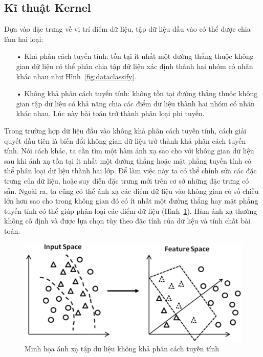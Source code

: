 \subsection*{Kĩ thuật Kernel}
Dựa vào đặc trưng về vị trí điểm dữ liệu, tập dữ liệu đầu vào có thể được chia làm hai loại:
\begin{itemize}
\item[•] Khả phân cách tuyến tính: tồn tại ít nhất một đường thẳng thuộc không gian dữ liệu có thể phân chia tập dữ liệu xác định thành hai nhóm có nhãn khác nhau như Hình~\ref{fig:dataclassify}.
\item[•] Không khả phân cách tuyến tính: không tồn tại đường thẳng thuộc không gian tập dữ liệu có khả năng chia các điểm dữ liệu thành hai nhóm có nhãn khác nhau. Lúc này bài toán trở thành phân loại phi tuyến.
\end{itemize}
Trong trường hợp dữ liệu đầu vào không khả phân cách tuyến tính, cách giải quyết đầu tiên là biến đổi không gian dữ liệu trở thành khả phân cách tuyến tính. Nói cách khác, ta cần tìm một hàm ánh xạ sao cho với không gian dữ liệu sau khi ánh xạ tồn tại ít nhất một đường thẳng hoặc mặt phẳng tuyến tính có thể phân loại dữ liệu thành hai lớp. Để làm việc này ta có thể chỉnh sửa các đặc trưng của dữ liệu, hoặc suy diễn đặc trưng mới trên cơ sở những đặc trưng có sẵn. Ngoài ra, ta cũng có thể ánh xạ các điểm dữ liệu vào không gian có số chiều lớn hơn sao cho trong không gian đó có ít nhất một đường thẳng hay mặt phẳng tuyến tính có thể giúp phân loại các điểm dữ liệu (Hình~\ref{fig:axkernel}). Hàm ánh xạ thường không cố định và được lựa chọn tùy theo đặc tính của dữ liệu và tính chất bài toán.
\begin{figure}[h]
\centering
\includegraphics[scale=0.3]{hinh/kernel.png}
\caption[Caption for LOF]{Minh họa ánh xạ tập dữ liệu không khả phân cách tuyến tính \footnotemark}
\label{fig:axkernel}
\end{figure}

